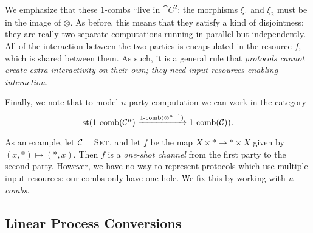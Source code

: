 We emphasize that these $1$-combs ``live in $\cat{C}^2$: the morphisms $\xi_1$
and $\xi_2$ must be in the image of $\otimes$. As before, this means that they
satisfy a kind of disjointness: they are really two separate computations
running in parallel but independently. All of the interaction between the two
parties is encapsulated in the resource $f$, which is shared between them. As
such, it is a general rule that \emph{protocols cannot create extra
  interactivity on their own; they need input resources enabling interaction}.

Finally, we note that to model $n$-party computation we can work in the category \[
  \operatorname*{st}(\operatorname*{1-comb}({\mathcal{C}}^n)\xrightarrow{\operatorname*{1-comb}(\otimes^{n-1})}\operatorname*{1-comb}({\mathcal{C}})).
\]

As an example, let ${\mathcal{C}} = {\textsc{\text{Set}}}$, and let $f$ be the map $X\times *\to
*\times X$ given by $(x, *)\mapsto (*, x)$. Then $f$ is a \emph{one-shot channel}
from the first party to the second party. However, we have no way to represent
protocols which use multiple input resources: our combs only have one hole. We
fix this by working with \emph{n-combs}.

\subsection{Linear Process Conversions}
\label{sec:libear-process-conversions}

